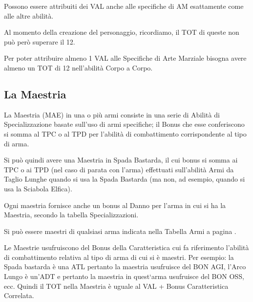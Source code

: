 Possono essere attribuiti dei VAL
anche alle specifiche di AM esattamente come alle altre abilit\`a.

Al momento della creazione del
personaggio, ricordiamo, il TOT di queste non pu\`o per\`o
superare il 12. 

Per poter attribuire almeno 1 VAL alle Specifiche di
Arte Marziale bisogna avere almeno un TOT di 12 nell'abilit\`a Corpo
a Corpo. 

\subsection{La Maestria} 

La Maestria (MAE) in una o pi\`u armi consiste in una serie di
Abilit\`a di Specializzazione basate sull'uso di armi specifiche; il
Bonus che esse conferiscono si somma al TPC o al TPD per l'abilit\`a
di combattimento corrispondente al tipo di arma.

Si pu\`o quindi avere una Maestria in Spada Bastarda, il cui bonus
si somma ai TPC o ai TPD (nel caso di parata con l'arma) effettuati
sull'abilit\`a Armi da Taglio Lunghe quando si usa la Spada Bastarda
(ma non, ad esempio, quando si usa la Sciabola Elfica).

Ogni maestria fornisce anche un bonus al Danno per l'arma in cui si ha
la Maestria, secondo la tabella Specializzazioni.

Si pu\`o essere maestri di qualsiasi arma indicata nella Tabella
Armi a pagina \pageref{tabarmi}.

Le Maestrie usufruiscono del Bonus della Caratteristica cui fa
riferimento l'abilit\`a di combattimento relativa al tipo di arma di
cui si \`e maestri. Per esempio: la Spada bastarda \`e una ATL
pertanto la maestria usufruisce del BON AGI, l'Arco Lungo \`e un'ADT e
pertanto la maestria in quest`arma usufruisce del BON OSS, ecc. Quindi
il TOT nella Maestria \`e uguale al VAL + Bonus Caratteristica
Correlata.




